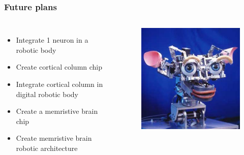 \documentclass[12pt, aspectratio=169]{beamer}
\begin{document}
\begin{frame}
  \frametitle{Future plans}
\begin{columns}[c]

\begin{itemize}
\item Integrate 1 neuron in a robotic body
\item Create cortical column chip
\item Integrate cortical column in digital robotic body
\item Create a memristive brain chip
\item Create memristive brain robotic architecture
\end{itemize}

\begin{figure}
\includegraphics[width=1.0\linewidth]{Kismet_312}
\end{figure}
\end{columns}
\end{frame}

\end{document}
